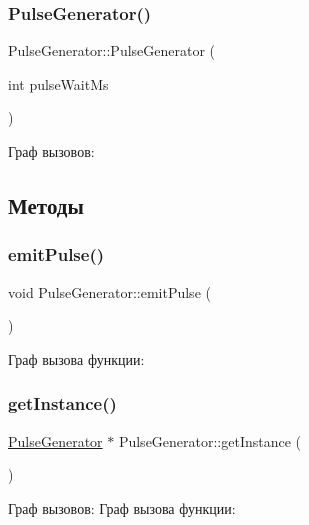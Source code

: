 \subsubsection{\texorpdfstring{Pulse\+Generator()}{PulseGenerator()}\hspace{0.1cm}{\footnotesize\ttfamily [2/2]}}
{\footnotesize\ttfamily Pulse\+Generator\+::\+Pulse\+Generator (\begin{DoxyParamCaption}\item[{int}]{pulse\+Wait\+Ms }\end{DoxyParamCaption})}

Граф вызовов\+:


\subsection{Методы}
\mbox{\label{class_pulse_generator_afb3edba196d7c85b08b7b4afc7d4956c}} 
\subsubsection{\texorpdfstring{emit\+Pulse()}{emitPulse()}}
{\footnotesize\ttfamily void Pulse\+Generator\+::emit\+Pulse (\begin{DoxyParamCaption}{ }\end{DoxyParamCaption})}

Граф вызова функции\+:
\mbox{\label{class_pulse_generator_ace9e6e44b3fcd3103b65805d44261ced}} 
\subsubsection{\texorpdfstring{get\+Instance()}{getInstance()}}
{\footnotesize\ttfamily \hyperlink{class_pulse_generator}{Pulse\+Generator} $\ast$ Pulse\+Generator\+::get\+Instance (\begin{DoxyParamCaption}{ }\end{DoxyParamCaption})\hspace{0.3cm}{\ttfamily [static]}}

Граф вызовов\+:
Граф вызова функции\+:
\mbox{\label{class_pulse_generator_a22da8e28f2e7621b1d87a92eaf527bba}} 
